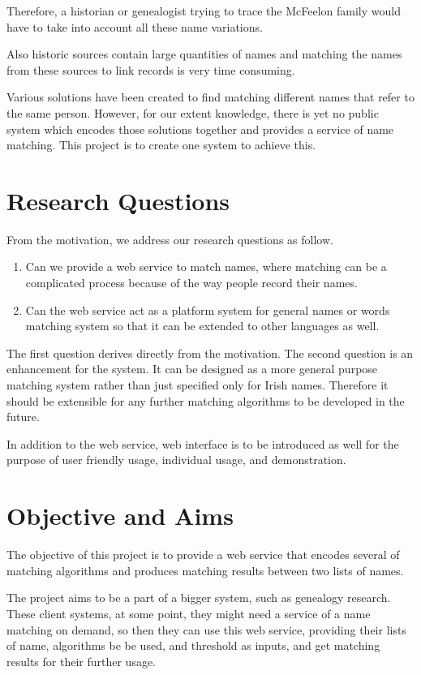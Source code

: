 Therefore, a historian or genealogist trying to trace the McFeelon family
would have to take into account all these name variations.

Also historic sources contain large quantities of names and
matching the names from these sources to link records is
very time consuming.

Various solutions have been created to find
matching different names that refer to the same person. However,
for our extent knowledge, there is yet no public system which encodes
those solutions together and provides a service of name matching.
This project is to create one system to achieve this.

\section{Research Questions}
\label{sec:rq}

From the motivation, we address our research questions as follow.

\begin{enumerate}
  \item Can we provide a web service to match names, where matching can be
    a complicated process because of the way people record their names.
  \item Can the web service act as a platform system for general names or words
    matching system so that it can be extended to other languages as well.
\end{enumerate}

The first question derives directly from the motivation.
The second question is an enhancement for the system. It can be designed
as a more general purpose matching system rather than just specified
only for Irish names. Therefore it should be extensible for any further
matching algorithms to be developed in the future.

In addition to the web service, web interface is to be introduced as well
for the purpose of user friendly usage, individual usage, and demonstration.

\section{Objective and Aims}
\label{sec:obj}

The objective of this project is to provide a web service that
encodes several of matching algorithms and produces matching
results between two lists of names.

The project aims to be a part of a bigger system, such as
genealogy research. These client systems, at some point,
they might need a service of a name matching on demand, so then they can use this
web service, providing their lists of name, algorithms be be used,
and threshold as inputs, and get matching results for their further usage.

